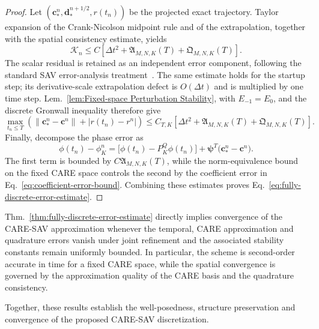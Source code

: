 \documentclass[10pt,reqno]{amsart}
\theoremstyle{remark}
\theoremstyle{definition}
\begin{document}
\begin{proof}
  Let $(\boldsymbol c_*^n,\boldsymbol d_*^{n+1/2},r(t_n))$ be the projected exact trajectory. Taylor expansion of the Crank-Nicolson midpoint rule and of the extrapolation, together with the spatial consistency estimate, yields
  \begin{equation}
    \mathcal K_n\leq C\left[\Delta t^2+\mathfrak A_{M,N,K}(T)+\mathfrak Q_{M,N,K}(T)\right].
    \label{eq:reference-residual-bound}
  \end{equation}
  The scalar residual is retained as an independent error component, following the standard SAV error-analysis treatment~\cite{Chen2020SAVFEM}. The same estimate holds for the startup step; its derivative-scale extrapolation defect is $O(\Delta t)$ and is multiplied by one time step. Lem.~\ref{lem:Fixed-space Perturbation Stability}, with $E_{-1}=E_0$, and the discrete Gronwall inequality therefore give
  \begin{equation}
    \max_{t_n\leq T}\left(\|\boldsymbol c_*^n-\boldsymbol c^n\|+|r(t_n)-r^n|\right)
    \leq C_{T,K}\left[\Delta t^2+\mathfrak A_{M,N,K}(T)+\mathfrak Q_{M,N,K}(T)\right].
    \label{eq:coefficient-error-bound}
  \end{equation}
  Finally, decompose the phase error as
  \begin{equation}
    \phi(t_n)-\phi_K^n=\bigl[\phi(t_n)-P_K^Q\phi(t_n)\bigr]+\boldsymbol\psi^{T}\bigl(\boldsymbol c_*^n-\boldsymbol c^n\bigr).
  \end{equation}
  The first term is bounded by $C\mathfrak A_{M,N,K}(T)$, while the norm-equivalence bound on the fixed CARE space controls the second by the coefficient error in Eq.~\ref{eq:coefficient-error-bound}. Combining these estimates proves Eq.~\ref{eq:fully-discrete-error-estimate}.
\end{proof}

Thm.~\ref{thm:fully-discrete-error-estimate} directly implies convergence of the CARE-SAV approximation whenever the temporal, CARE approximation and quadrature errors vanish under joint refinement and the associated stability constants remain uniformly bounded. In particular, the scheme is second-order accurate in time for a fixed CARE space, while the spatial convergence is governed by the approximation quality of the CARE basis and the quadrature consistency.

Together, these results establish the well-posedness, structure preservation and convergence of the proposed CARE-SAV discretization.
\end{document}
